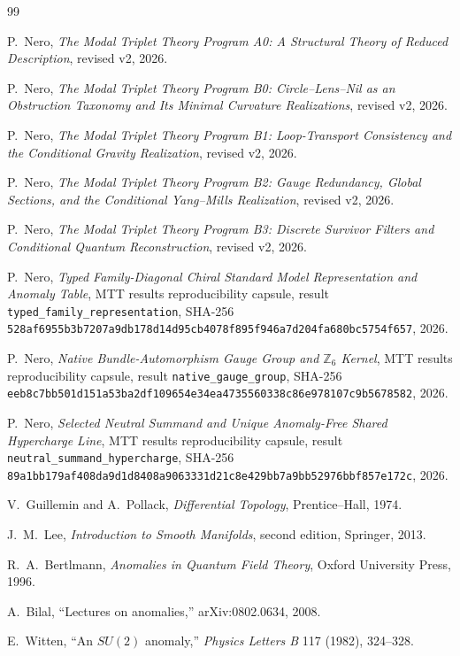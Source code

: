 \documentclass[11pt]{article}
\begin{document}
\begin{thebibliography}{99}
\raggedright

P.~Nero,
\newblock \emph{The Modal Triplet Theory Program A0: A Structural Theory of
Reduced Description}, revised v2, 2026.

P.~Nero,
\newblock \emph{The Modal Triplet Theory Program B0: Circle--Lens--Nil as an
Obstruction Taxonomy and Its Minimal Curvature Realizations},
revised v2, 2026.

P.~Nero,
\newblock \emph{The Modal Triplet Theory Program B1: Loop-Transport
Consistency and the Conditional Gravity Realization},
revised v2, 2026.

P.~Nero,
\newblock \emph{The Modal Triplet Theory Program B2: Gauge Redundancy, Global
Sections, and the Conditional Yang--Mills Realization},
revised v2, 2026.

P.~Nero,
\newblock \emph{The Modal Triplet Theory Program B3: Discrete Survivor
Filters and Conditional Quantum Reconstruction},
revised v2, 2026.

P.~Nero,
\newblock \emph{Typed Family-Diagonal Chiral Standard Model Representation and
Anomaly Table},
\newblock MTT results reproducibility capsule, result
\texttt{typed\_family\_representation},
SHA-256
\nolinkurl{528af6955b3b7207a9db178d14d95cb4078f895f946a7d204fa680bc5754f657},
2026.

P.~Nero,
\newblock \emph{Native Bundle-Automorphism Gauge Group and
$\mathbb Z_6$ Kernel},
\newblock MTT results reproducibility capsule, result
\texttt{native\_gauge\_group},
SHA-256
\nolinkurl{eeb8c7bb501d151a53ba2df109654e34ea4735560338c86e978107c9b5678582},
2026.

P.~Nero,
\newblock \emph{Selected Neutral Summand and Unique Anomaly-Free Shared
Hypercharge Line},
\newblock MTT results reproducibility capsule, result
\texttt{neutral\_summand\_hypercharge},
SHA-256
\nolinkurl{89a1bb179af408da9d1d8408a9063331d21c8e429bb7a9bb52976bbf857e172c},
2026.

V.~Guillemin and A.~Pollack,
\newblock \emph{Differential Topology},
Prentice--Hall, 1974.

J.~M.~Lee,
\newblock \emph{Introduction to Smooth Manifolds}, second edition,
Springer, 2013.

R.~A.~Bertlmann,
\newblock \emph{Anomalies in Quantum Field Theory},
Oxford University Press, 1996.

A.~Bilal,
\newblock ``Lectures on anomalies,''
\newblock arXiv:0802.0634, 2008.

E.~Witten,
\newblock ``An $SU(2)$ anomaly,''
\newblock \emph{Physics Letters B} 117 (1982), 324--328.

\end{thebibliography}
\end{document}
